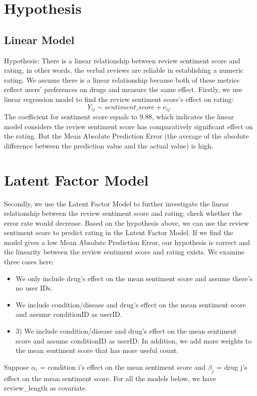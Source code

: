 \documentclass{article}
\begin{document}
\section{Hypothesis}
\subsection{Linear Model}
Hypothesis: There is a linear relationship between review sentiment score and rating, 
in other words, the verbal reviews are reliable in establishing a numeric 
rating. We assume there is a linear relationship because both of these metrics reflect 
users’ preferences on drugs and measure the same effect. \newline \newline Firstly, we use 
linear regression model to find the review sentiment score’s effect on 
rating:
\[Y_{ij} \sim sentiment\_score + e_{ij}\]
The coefficient for sentiment score equals to 9.88, which indicates the 
linear model considers the review sentiment score has comparatively 
significant effect on the rating. But the Mean Absolute Prediction 
Error (the average of the absolute difference between the prediction 
value and the actual value) is high. 

\section{Latent Factor Model}
Secondly, we use the Latent Factor Model to further investigate the 
linear relationship between the review sentiment score and rating; 
check whether the error rate would decrease. Based on the hypothesis above, 
we can use the review sentiment score to predict rating in the Latent Factor 
Model. If we find the model gives a low Mean Absolute Prediction Error, 
our hypothesis is correct and the linearity between the review sentiment 
score and rating exists. We examine three cases here:
\begin{itemize}
  \item We only include drug’s effect on the mean sentiment score and assume there’s no user IDs.
  \item We include condition/disease and drug’s effect on the mean sentiment score and assume conditionID as userID.
  \item 3)	We include condition/disease and drug’s effect on the mean sentiment score and assume conditionID 
  as userID. In addition, we add more weights to the mean sentiment score that has more useful count.
\end{itemize}
Suppose \(\alpha_i\) = condition i’s effect on the mean sentiment score and
\(\beta_j\) = drug j’s effect on the mean sentiment score. For all the models below, 
we have review\_length as covariate. 
\end{document}
